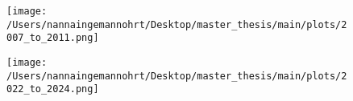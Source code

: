 \begin{figure}[H]
    \centering
    \texttt{[image: /Users/nannaingemannohrt/Desktop/master\_thesis/main/plots/2007\_to\_2011.png]}
    \caption{}
    \label{fig:2007_2011}
\end{figure}
\noindent

\begin{figure}[H]
    \centering
    \texttt{[image: /Users/nannaingemannohrt/Desktop/master\_thesis/main/plots/2022\_to\_2024.png]}
    \caption{}
    \label{fig:2007_2011}
\end{figure}
\noindent

